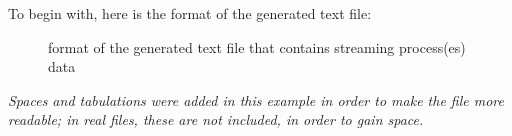 \documentclass[a4paper,11pt]{report}
\begin{document}
To begin with, here is the format of the generated text file:
\begin{figure}[H]
\vspace{-5pt}
\begin{center}
\vspace{-5pt}
\caption{format of the generated text file that contains streaming process(es) data}
\end{center}
\end{figure}

\textit{Spaces and tabulations were added in this example in order to make the file more readable; in real files, these are not included, in order to gain space.}\\
\end{document}
